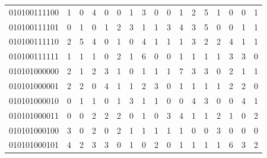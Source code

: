 \documentclass[10pt,a4paper]{article}
\begin{document}
\begin{longtable}{ |c|c|c|c|c|c|c|c|c|c|c|c|c|c|c|c|c| }
    010100111100              & 1                            & 0                                & 4                            & 0                              & 0   & 1   & 3   & 0   & 0   & 1   & 2   & 5   & 1   & 0   & 0   & 1   \\
    010100111101              & 0                            & 1                                & 0                            & 1                              & 2   & 3   & 1   & 1   & 3   & 4   & 3   & 5   & 0   & 0   & 1   & 1   \\
    010100111110              & 2                            & 5                                & 4                            & 0                              & 1   & 0   & 4   & 1   & 1   & 1   & 3   & 2   & 2   & 4   & 1   & 1   \\
    010100111111              & 1                            & 1                                & 1                            & 0                              & 2   & 1   & 6   & 0   & 0   & 1   & 1   & 1   & 1   & 3   & 3   & 0   \\
    010101000000              & 2                            & 1                                & 2                            & 3                              & 1   & 0   & 1   & 1   & 1   & 7   & 3   & 3   & 0   & 2   & 1   & 1   \\
    010101000001              & 2                            & 2                                & 0                            & 4                              & 1   & 1   & 2   & 3   & 0   & 1   & 1   & 1   & 1   & 2   & 2   & 0   \\
    010101000010              & 0                            & 1                                & 1                            & 0                              & 1   & 3   & 1   & 1   & 0   & 0   & 4   & 3   & 0   & 0   & 4   & 1   \\
    010101000011              & 0                            & 0                                & 2                            & 2                              & 2   & 0   & 1   & 0   & 3   & 4   & 1   & 1   & 2   & 1   & 0   & 2   \\
    010101000100              & 3                            & 0                                & 2                            & 0                              & 2   & 1   & 1   & 1   & 1   & 1   & 0   & 0   & 3   & 0   & 0   & 0   \\
    010101000101              & 4                            & 2                                & 3                            & 3                              & 0   & 1   & 0   & 2   & 0   & 1   & 1   & 1   & 1   & 6   & 3   & 2   \\

\end{longtable}
\end{document}
